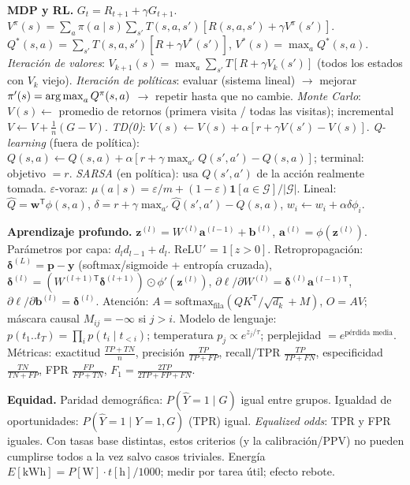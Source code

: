 \begin{formulario}
\textbf{MDP y RL.} $G_t=R_{t+1}+\gamma G_{t+1}$.
$V^\pi(s)=\sum_a\pi(a\mid s)\sum_{s'}T(s,a,s')[R(s,a,s')+\gamma V^\pi(s')]$.
$Q^*(s,a)=\sum_{s'}T(s,a,s')[R+\gamma V^*(s')]$, $V^*(s)=\max_aQ^*(s,a)$.
\emph{Iteración de valores}: $V_{k+1}(s)=\max_a\sum_{s'}T[R+\gamma V_k(s')]$ (todos los estados con $V_k$ viejo).
\emph{Iteración de políticas}: evaluar (sistema lineal) $\to$ mejorar $\pi'(s)=\operatorname*{arg\,max}_aQ^\pi(s,a)$ $\to$ repetir hasta que no cambie.
\emph{Monte Carlo}: $V(s)\leftarrow$ promedio de retornos (primera visita / todas las visitas); incremental $V\leftarrow V+\frac1n(G-V)$.
\emph{TD(0)}: $V(s)\leftarrow V(s)+\alpha[r+\gamma V(s')-V(s)]$.
\emph{Q-learning} (fuera de política): $Q(s,a)\leftarrow Q(s,a)+\alpha[r+\gamma\max_{a'}Q(s',a')-Q(s,a)]$; terminal: objetivo $=r$.
\emph{SARSA} (en política): usa $Q(s',a')$ de la acción realmente tomada.
$\varepsilon$-voraz: $\mu(a\mid s)=\varepsilon/m+(1-\varepsilon)\mathbf 1[a\in\mathcal G]/|\mathcal G|$.
Lineal: $\hat Q=\mathbf w^\mathsf T\phi(s,a)$, $\delta=r+\gamma\max_{a'}\hat Q(s',a')-\hat Q(s,a)$, $w_i\leftarrow w_i+\alpha\delta\phi_i$.
\end{formulario}

\begin{formulario}
\textbf{Aprendizaje profundo.} $\mathbf z^{(l)}=W^{(l)}\mathbf a^{(l-1)}+\mathbf b^{(l)}$, $\mathbf a^{(l)}=\phi(\mathbf z^{(l)})$.
Parámetros por capa: $d_l d_{l-1}+d_l$. ReLU$'$ = $1[z>0]$.
Retropropagación: $\boldsymbol\delta^{(L)}=\mathbf p-\mathbf y$ (softmax/sigmoide + entropía cruzada),
$\boldsymbol\delta^{(l)}=(W^{(l+1)\mathsf T}\boldsymbol\delta^{(l+1)})\odot\phi'(\mathbf z^{(l)})$,
$\partial\ell/\partial W^{(l)}=\boldsymbol\delta^{(l)}\mathbf a^{(l-1)\mathsf T}$, $\partial\ell/\partial\mathbf b^{(l)}=\boldsymbol\delta^{(l)}$.
Atención: $A=\mathrm{softmax}_{\text{fila}}(QK^\mathsf T/\sqrt{d_k}+M)$, $O=AV$; máscara causal $M_{ij}=-\infty$ si $j>i$.
Modelo de lenguaje: $p(t_1..t_T)=\prod_ip(t_i\mid t_{<i})$; temperatura $p_j\propto e^{z_j/\tau}$; perplejidad $=e^{\text{pérdida media}}$.
Métricas: exactitud $\frac{TP+TN}{n}$, precisión $\frac{TP}{TP+FP}$, recall/TPR $\frac{TP}{TP+FN}$, especificidad $\frac{TN}{TN+FP}$, FPR $\frac{FP}{FP+TN}$, $F_1=\frac{2TP}{2TP+FP+FN}$.
\end{formulario}

\begin{formulario}
\textbf{Equidad.} Paridad demográfica: $P(\hat Y=1\mid G)$ igual entre grupos. Igualdad de oportunidades:
$P(\hat Y=1\mid Y=1,G)$ (TPR) igual. \emph{Equalized odds}: TPR y FPR iguales. Con tasas base distintas,
estos criterios (y la calibración/PPV) no pueden cumplirse todos a la vez salvo casos triviales.
Energía $E[\mathrm{kWh}]=P[\mathrm W]\cdot t[\mathrm h]/1000$; medir por tarea útil; efecto rebote.
\end{formulario}

